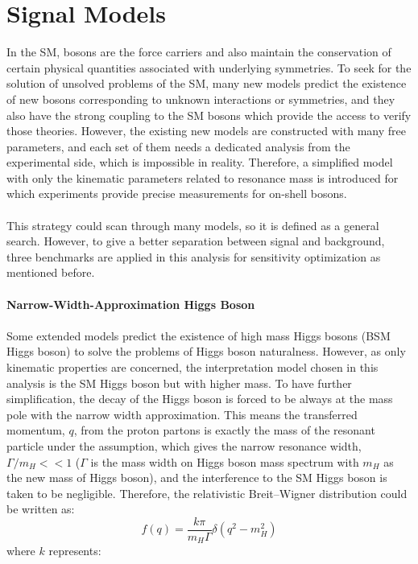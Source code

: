 \section{Signal Models}
\label{sec:signal_intro}
In the SM, bosons are the force carriers and also maintain the conservation of certain physical quantities associated with underlying symmetries. To seek for the solution of unsolved problems of the SM, many new models predict the existence of new bosons corresponding to unknown interactions or symmetries, and they also have the strong coupling to the SM bosons which provide the access to verify those theories. However, the existing new models are constructed with many free parameters, and each set of them needs a dedicated analysis from the experimental side, which is impossible in reality. Therefore, a simplified model with only the kinematic parameters related to resonance mass is introduced for which experiments provide precise measurements for on-shell bosons.  
\\
\\This strategy could scan through many models, so it is defined as a general search. However, to give a better separation between signal and background, three benchmarks are applied in this analysis for sensitivity optimization as mentioned before. 
\\
\\{\bf Narrow-Width-Approximation Higgs Boson}
\\
\\Some extended models predict the existence of high mass Higgs bosons (BSM Higgs boson) to solve the problems of Higgs boson naturalness. However, as only kinematic properties are concerned, the interpretation model chosen in this analysis is the SM Higgs boson but with higher mass. To have further simplification, the decay of the Higgs boson is forced to be always at the mass pole with the narrow width approximation. This means the transferred momentum, $q$, from the proton partons is exactly the mass of the resonant particle under the assumption, which gives the narrow resonance width, $\Gamma/m_{H}<<1$ ($\Gamma$ is the mass width on Higgs boson mass spectrum with $m_{H}$ as the new mass of Higgs boson), and the interference to the SM Higgs boson is taken to be negligible\cite{NWAInterference}. Therefore, the relativistic Breit–Wigner distribution could be written as:
\begin{equation}
f(q) = \frac{k\pi}{m_{H}\Gamma}\delta(q^2-m_{H}^2)
\end{equation}
where $k$ represents:
